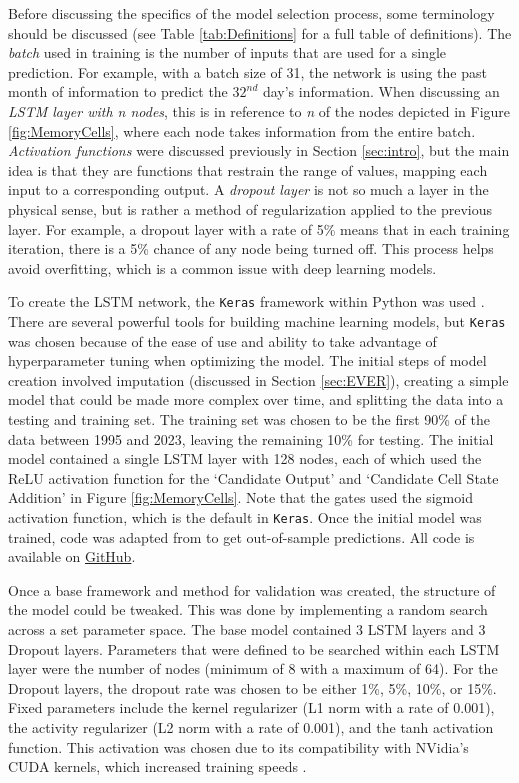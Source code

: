 Before discussing the specifics of the model selection process, some terminology should be discussed (see Table \ref{tab:Definitions} for a full table of definitions). The \textit{batch} used in training is the number of inputs that are used for a single prediction. For example, with a batch size of 31, the network is using the past month of information to predict the $32^{nd}$ day's information. When discussing an \textit{LSTM layer with n nodes}, this is in reference to \textit{n} of the nodes depicted in Figure \ref{fig:MemoryCells}, where each node takes information from the entire batch. \textit{Activation functions} were discussed previously in Section \ref{sec:intro}, but the main idea is that they are functions that restrain the range of values, mapping each input to a corresponding output. A \textit{dropout layer} is not so much a layer in the physical sense, but is rather a method of regularization applied to the previous layer. For example, a dropout layer with a rate of 5\% means that in each training iteration, there is a 5\% chance of any node being turned off. This process helps avoid over\-fitting, which is a common issue with deep learning models.

To create the LSTM network, the \texttt{Keras} framework within Python was used \citep{chollet2015keras}. There are several powerful tools for building machine learning models, but \texttt{Keras} was chosen because of the ease of use and ability to take advantage of hyperparameter tuning when optimizing the model. The initial steps of model creation involved imputation (discussed in Section \ref{sec:EVER}), creating a simple model that could be made more complex over time, and splitting the data into a testing and training set. The training set was chosen to be the first 90\% of the data between 1995 and 2023, leaving the remaining 10\% for testing. The initial model contained a single LSTM layer with 128 nodes, each of which used the ReLU activation function for the `Candidate Output' and `Candidate Cell State Addition' in Figure \ref{fig:MemoryCells}. Note that the gates used the sigmoid activation function, which is the default in \texttt{Keras}. Once the initial model was trained, code was adapted from \cite{lstmkeras} to get out-of-sample predictions. All code is available on \href{https://github.com/lliucci/Writing-Project}{GitHub}.

Once a base framework and method for validation was created, the structure of the model could be tweaked. This was done by implementing a random search across a set parameter space. The base model contained 3 LSTM layers and 3 Dropout layers. Parameters that were defined to be searched within each LSTM layer were the number of nodes (minimum of 8 with a maximum of 64). For the Dropout layers, the dropout rate was chosen to be either 1\%, 5\%, 10\%, or 15\%. Fixed parameters include the kernel regularizer (L1 norm with a rate of 0.001), the activity regularizer (L2 norm with a rate of 0.001), and the tanh activation function. This activation was chosen due to its compatibility with NVidia's CUDA kernels, which increased training speeds \citep{cuda}.

